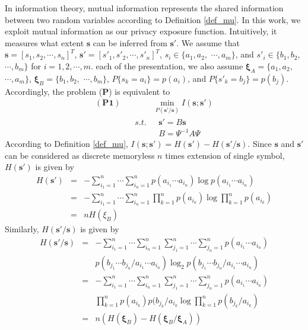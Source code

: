 \documentclass[conference]{IEEEtran}
\begin{document}
In information theory, mutual information represents the shared information between two random variables according to Definition \ref{def_mu}. In this work, we exploit mutual information as our privacy exposure function. Intuitively, it measures what extent $\mathbf{s}$ can be inferred from $\mathbf{s}'$. We assume that  $\mathbf{s}=[s_1,s_2,\cdots,s_n]^T$,   $\mathbf{s}'=[s'_1,s'_2,\cdots,s'_n]^T$,  $s_i\in\{a_1,a_2,$ $\cdots,a_m\}$, and $s'_i\in\{b_1,b_2,$ $\cdots,b_m\}$ for $i=1,2,\cdots,m$. each of the presentation, we also assume $\mathbf{\xi}_A=\{a_1,a_2,$ $\cdots,a_m\}$, $\mathbf{\xi}_B=\{b_1,b_2,$ $\cdots,b_m\}$, $P\{s_k=a_i\}=p(a_i)$,  and $P\{s'_k=b_j\}=p(b_j)$. Accordingly, the problem ($\mathbf{P}$) is equivalent to
\begin{eqnarray*}\label{e_mu_p}
    \mathbf{(P1)}~~~~   &  &      \underset{P(\mathbf{s}'/\mathbf{s})}{\min} I(\mathbf{s};\mathbf{s}')\\
   & s.t.& ~~~\mathbf{s}'=B \mathbf{s} \\
   & &    ~~~B=\Psi^{-1}A\Psi
\end{eqnarray*}
According to Definition \ref{def_mu}, $I(\mathbf{s};\mathbf{s}')=H(\mathbf{s}')-H(\mathbf{s}'/\mathbf{s})$. Since $\mathbf{s}$ and $\mathbf{s}'$ can be considered as discrete memoryless $n$ times extension of single symbol, $H(\mathbf{s}')$ is given by
\begin{eqnarray*}
    H(\mathbf{s}')&=&-\sum_{i_1=1}^{n}\cdots\sum_{i_n=1}^{n}p(a_{i_1}\cdots a_{i_n})\log p(a_{i_1}\cdots a_{i_n})  \\
    &=& -\sum_{i_1=1}^{n}\cdots\sum_{i_n=1}^{n}\prod_{k=1}^n p(a_{i_k})\log \prod_{k=1}^n p(a_{i_k})  \\
    &=& n H(\xi_B)
\end{eqnarray*}
Similarly, $H(\mathbf{s}'/\mathbf{s})$ is given by
{\small
\begin{eqnarray*}
H(\mathbf{s}'/\mathbf{s}) &=& -\sum_{i_{1}=1}^{n}\cdots \sum_{i_{n}=1}^{n}\sum_{j_{1}=1}^{n}\cdots \sum_{j_{n}=1}^{n}p(a_{i_1}\cdots a_{i_n})  \\
          & & p(b_{j_1}\cdots b_{j_n}/a_{i_1}\cdots a_{i_n})\log_2p(b_{j_1}\cdots b_{j_n}/a_{i_1}\cdots a_{i_n})   \\
          &=& -\sum_{i_{1}=1}^{n}\cdots \sum_{i_{n}=1}^{n}\sum_{j_{1}=1}^{n}\cdots \sum_{j_{n}=1}^{n}p(a_{i_1}\cdots a_{i_n}) \\
          & &   \prod_{k=1}^n p(a_{i_k})p(b_{j_k}/a_{i_k}\log \prod_{k=1}^n p(b_{j_k}/a_{i_k})  \\
          &=& n(H(\mathbf{\xi}_B)-H(\mathbf{\xi}_B/\mathbf{\xi}_A))
\end{eqnarray*}}
\end{document}
